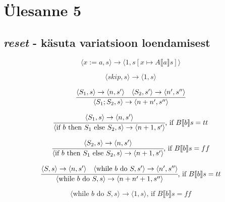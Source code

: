 \section{Ülesanne 5}

\subsection{\textit{reset} - käsuta variatsioon loendamisest}

\[
\langle x:=a,s \rangle \rightarrow
\langle 1, s[x \mapsto A \llbracket a \rrbracket s] \rangle
\]

\[
\langle skip,s \rangle \rightarrow
\langle 1, s \rangle
\]

\[
\cfrac{
  \langle S_1,s \rangle \rightarrow
  \langle n,s' \rangle
  \quad
  \langle S_2,s' \rangle \rightarrow
  \langle n',s'' \rangle
}{
  \langle S_1;S_2,s \rangle \rightarrow
  \langle n + n', s'' \rangle
}
\]

\[
\cfrac{
  \langle S_1,s \rangle \rightarrow
  \langle n,s' \rangle
}{
  \langle \text{if\ } b \text{\ then\ } S_1 \text{\ else\ } S_2,s \rangle
  \rightarrow
  \langle n + 1, s' \rangle
}\text{,\ if } B \llbracket b \rrbracket s = tt
\]

\[
\cfrac{
  \langle S_2,s \rangle \rightarrow
  \langle n,s' \rangle
}{
  \langle \text{if\ } b \text{\ then\ } S_1 \text{\ else\ } S_2,s \rangle
  \rightarrow
  \langle n + 1, s' \rangle
}\text{,\ if } B \llbracket b \rrbracket s = ff
\]

\[
\cfrac{
  \langle S,s \rangle \rightarrow
  \langle n,s' \rangle
  \quad
  \langle \text{while\ } b \text{\ do\ } S,s' \rangle
  \rightarrow
  \langle n', s'' \rangle
}{
  \langle \text{while\ } b \text{\ do\ } S,s \rangle
  \rightarrow
  \langle n + n' + 1, s'' \rangle
}\text{,\ if } B \llbracket b \rrbracket s = tt
\]

\[
\langle \text{while\ } b \text{\ do\ } S,s \rangle
\rightarrow
\langle 1, s \rangle
\text{,\ if } B \llbracket b \rrbracket s = ff
\]

